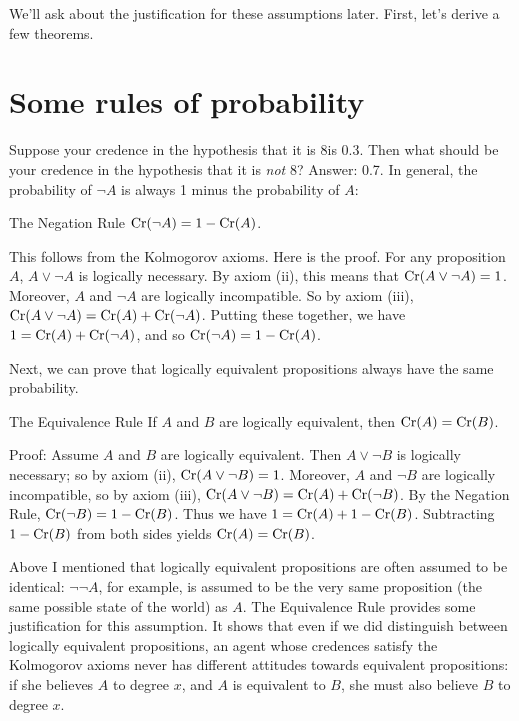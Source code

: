 We'll ask about the justification for these assumptions later. First,
let's derive a few theorems.


\section{Some rules of probability}

Suppose your credence in the hypothesis that it is 8\celsius is
0.3. Then what should be your credence in the hypothesis that it is
\emph{not} 8\celsius? Answer: 0.7. In general, the probability of
$\neg A$ is always 1 minus the probability of $A$:

\begin{genericthm}{The Negation Rule}
  $\text{Cr}(\neg A) = 1 - \text{Cr}(A)$.
\end{genericthm}

This follows from the Kolmogorov axioms. Here is the proof. For any
proposition $A$, $A \lor \neg A$ is logically necessary. By axiom
(ii), this means that $\text{Cr}(A \lor \neg A) = 1$. Moreover, $A$ and
$\neg A$ are logically incompatible. So by axiom (iii), $\text{Cr}(A \lor
\neg A) = \text{Cr}(A) + \text{Cr}(\neg A)$. Putting these together, we have $1 =
\text{Cr}(A) + \text{Cr}(\neg A)$, and so $\text{Cr}(\neg A) = 1-\text{Cr}(A)$.

Next, we can prove that logically equivalent propositions always have
the same probability.

\begin{genericthm}{The Equivalence Rule}
  If $A$ and $B$ are logically equivalent, then $\text{Cr}(A) = \text{Cr}(B)$.
\end{genericthm}
Proof: Assume $A$ and $B$ are logically equivalent. Then $A \lor \neg
B$ is logically necessary; so by axiom (ii), $\text{Cr}(A \lor \neg B) =
1$. Moreover, $A$ and $\neg B$ are logically incompatible, so by axiom
(iii), $\text{Cr}(A \lor \neg B) = \text{Cr}(A) + \text{Cr}(\neg B)$.  By the Negation Rule,
$\text{Cr}(\neg B) = 1-\text{Cr}(B)$. Thus we have $1 = \text{Cr}(A) + 1 -
\text{Cr}(B)$. Subtracting $1-\text{Cr}(B)$ from both sides yields $\text{Cr}(A) =
\text{Cr}(B)$.

Above I mentioned that logically equivalent propositions are often
assumed to be identical: $\neg\neg A$, for example, is assumed to be
the very same proposition (the same possible state of the world) as
$A$. The Equivalence Rule provides some justification for this
assumption. It shows that even if we did distinguish between logically
equivalent propositions, an agent whose credences satisfy the
Kolmogorov axioms never has different attitudes towards equivalent
propositions: if she believes $A$ to degree $x$, and $A$ is equivalent
to $B$, she must also believe $B$ to degree $x$.

